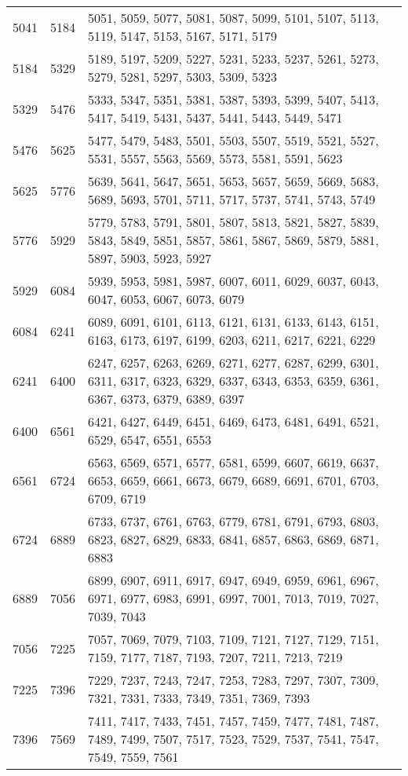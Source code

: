 \documentclass[12pt]{article}
\begin{document}
\begin{tabular}{|c|l|l|}
5041 & 5184 & 5051, 5059, 5077, 5081, 5087, 5099, 5101, 5107, 5113, 5119, 5147, 5153, 5167, 5171, 5179 \\
5184 & 5329 & 5189, 5197, 5209, 5227, 5231, 5233, 5237, 5261, 5273, 5279, 5281, 5297, 5303, 5309, 5323 \\
5329 & 5476 & 5333, 5347, 5351, 5381, 5387, 5393, 5399, 5407, 5413, 5417, 5419, 5431, 5437, 5441, 5443, 5449, 5471 \\
5476 & 5625 & 5477, 5479, 5483, 5501, 5503, 5507, 5519, 5521, 5527, 5531, 5557, 5563, 5569, 5573, 5581, 5591, 5623 \\
5625 & 5776 & 5639, 5641, 5647, 5651, 5653, 5657, 5659, 5669, 5683, 5689, 5693, 5701, 5711, 5717, 5737, 5741, 5743, 5749 \\
5776 & 5929 & 5779, 5783, 5791, 5801, 5807, 5813, 5821, 5827, 5839, 5843, 5849, 5851, 5857, 5861, 5867, 5869, 5879, 5881, 5897, 5903, 5923, 5927 \\
5929 & 6084 & 5939, 5953, 5981, 5987, 6007, 6011, 6029, 6037, 6043, 6047, 6053, 6067, 6073, 6079 \\
6084 & 6241 & 6089, 6091, 6101, 6113, 6121, 6131, 6133, 6143, 6151, 6163, 6173, 6197, 6199, 6203, 6211, 6217, 6221, 6229 \\
6241 & 6400 & 6247, 6257, 6263, 6269, 6271, 6277, 6287, 6299, 6301, 6311, 6317, 6323, 6329, 6337, 6343, 6353, 6359, 6361, 6367, 6373, 6379, 6389, 6397 \\
6400 & 6561 & 6421, 6427, 6449, 6451, 6469, 6473, 6481, 6491, 6521, 6529, 6547, 6551, 6553 \\
6561 & 6724 & 6563, 6569, 6571, 6577, 6581, 6599, 6607, 6619, 6637, 6653, 6659, 6661, 6673, 6679, 6689, 6691, 6701, 6703, 6709, 6719 \\
6724 & 6889 & 6733, 6737, 6761, 6763, 6779, 6781, 6791, 6793, 6803, 6823, 6827, 6829, 6833, 6841, 6857, 6863, 6869, 6871, 6883 \\
6889 & 7056 & 6899, 6907, 6911, 6917, 6947, 6949, 6959, 6961, 6967, 6971, 6977, 6983, 6991, 6997, 7001, 7013, 7019, 7027, 7039, 7043 \\
7056 & 7225 & 7057, 7069, 7079, 7103, 7109, 7121, 7127, 7129, 7151, 7159, 7177, 7187, 7193, 7207, 7211, 7213, 7219 \\
7225 & 7396 & 7229, 7237, 7243, 7247, 7253, 7283, 7297, 7307, 7309, 7321, 7331, 7333, 7349, 7351, 7369, 7393 \\
7396 & 7569 & 7411, 7417, 7433, 7451, 7457, 7459, 7477, 7481, 7487, 7489, 7499, 7507, 7517, 7523, 7529, 7537, 7541, 7547, 7549, 7559, 7561 \\

\end{tabular}
\end{document}
